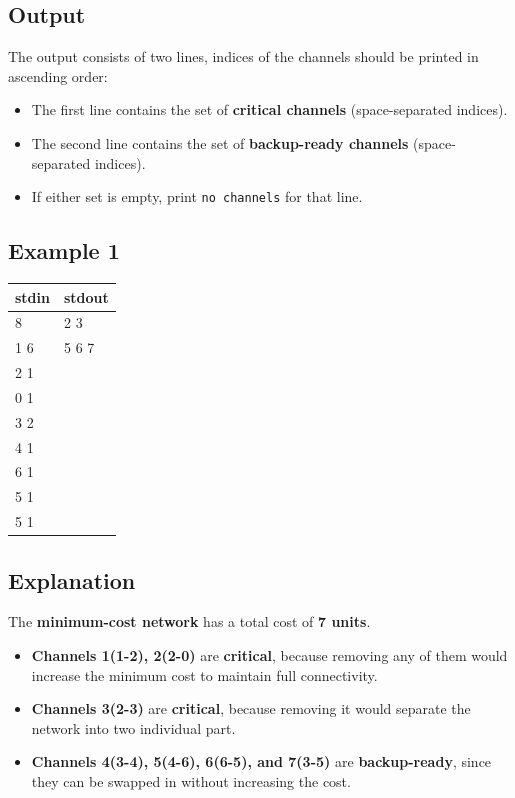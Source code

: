 \documentclass[12pt,a4paper]{article}
\begin{document}
\subsection*{\fontsize{16}{12}Output}
The output consists of two lines, indices of the channels should be printed in ascending order:
\begin{itemize}
    \item The first line contains the set of \textbf{critical channels} (space-separated indices).
    \item The second line contains the set of \textbf{backup-ready channels} (space-separated indices).
    \item If either set is empty, print \texttt{no channels} for that line.
\end{itemize}

\subsection*{\fontsize{16}{12}Example 1}
\begin{table}[h]
  \centering
  \begin{tabularx}{\textwidth}{|>{\ttfamily}X|>{\ttfamily}X|}
  \hline
  \textbf{stdin} & \textbf{stdout} \\
  \hline
    7 8 & 1 2 3 \\
    0 1 6 & 4 5 6 7 \\
    1 2 1 & \\
    2 0 1 & \\
    2 3 2 & \\
    3 4 1 & \\
    4 6 1 & \\
    6 5 1 & \\
    3 5 1 & \\
  \hline
  \end{tabularx}
\end{table}

\subsection*{\fontsize{16}{12}Explanation}
The \textbf{minimum-cost network} has a total cost of \textbf{7 units}.

\begin{itemize}
    \item \textbf{Channels 1(1-2), 2(2-0)} are \textbf{critical}, because removing any of them would increase the minimum cost to maintain full connectivity.
    \item \textbf{Channels 3(2-3)} are \textbf{critical}, because removing it would separate the network into two individual part.
    \item \textbf{Channels 4(3-4), 5(4-6), 6(6-5), and 7(3-5)} are \textbf{backup-ready}, since they can be swapped in without increasing the cost.
\end{itemize}
\end{document}
